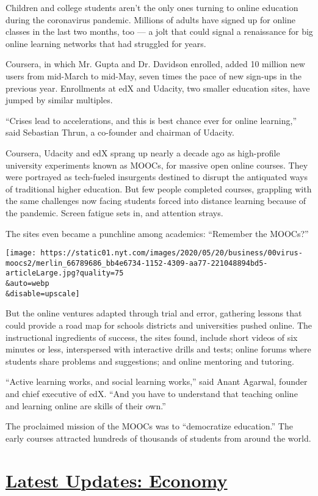 Children and college students aren't the only ones turning to online
education during the coronavirus pandemic. Millions of adults have
signed up for online classes in the last two months, too --- a jolt that
could signal a renaissance for big online learning networks that had
struggled for years.

Coursera, in which Mr. Gupta and Dr. Davidson enrolled, added 10 million
new users from mid-March to mid-May, seven times the pace of new
sign-ups in the previous year. Enrollments at edX and Udacity, two
smaller education sites, have jumped by similar multiples.

``Crises lead to accelerations, and this is best chance ever for online
learning,'' said Sebastian Thrun, a co-founder and chairman of Udacity.

Coursera, Udacity and edX sprang up nearly a decade ago as high-profile
university experiments known as MOOCs, for massive open online courses.
They were portrayed as tech-fueled insurgents destined to disrupt the
antiquated ways of traditional higher education. But few people
completed courses, grappling with the same challenges now facing
students forced into distance learning because of the pandemic. Screen
fatigue sets in, and attention strays.

The sites even became a punchline among academics: ``Remember the
MOOCs?''

\texttt{[image: https://static01.nyt.com/images/2020/05/20/business/00virus-moocs2/merlin\_66789686\_bb4e6734-1152-4309-aa77-221048894bd5-articleLarge.jpg?quality=75\\\&auto=webp\\\&disable=upscale]}

But the online ventures adapted through trial and error, gathering
lessons that could provide a road map for schools districts and
universities pushed online. The instructional ingredients of success,
the sites found, include short videos of six minutes or less,
interspersed with interactive drills and tests; online forums where
students share problems and suggestions; and online mentoring and
tutoring.

``Active learning works, and social learning works,'' said Anant
Agarwal, founder and chief executive of edX. ``And you have to
understand that teaching online and learning online are skills of their
own.''

The proclaimed mission of the MOOCs was to ``democratize education.''
The early courses attracted hundreds of thousands of students from
around the world.

\hypertarget{latest-updates-economy}{%
\section{\texorpdfstring{\href{https://www.nytimes.com/live/2020/07/31/business/stock-market-today-coronavirus?action=click\&pgtype=Article\&state=default\&region=MAIN_CONTENT_1\&context=storylines_live_updates}{Latest
Updates:
Economy}}{Latest Updates: Economy}}\label{latest-updates-economy}}

